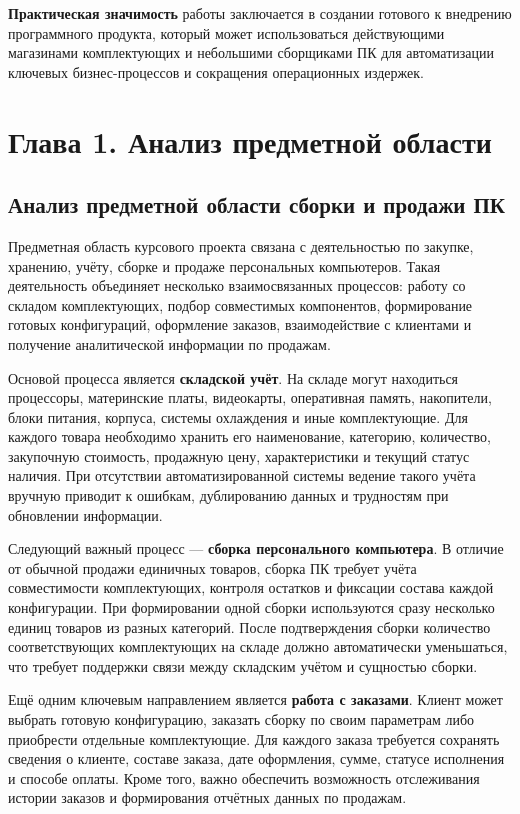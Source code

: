 \documentclass[14pt, a4paper]{extarticle}
\begin{document}
\textbf{Практическая значимость} работы заключается в создании готового к внедрению программного продукта, который может использоваться действующими магазинами комплектующих и небольшими сборщиками ПК для автоматизации ключевых бизнес-процессов и сокращения операционных издержек.

\section*{Глава 1. Анализ предметной области}

\subsection{Анализ предметной области сборки и продажи ПК}

Предметная область курсового проекта связана с деятельностью по закупке, хранению, учёту, сборке и продаже персональных компьютеров. Такая деятельность объединяет несколько взаимосвязанных процессов: работу со складом комплектующих, подбор совместимых компонентов, формирование готовых конфигураций, оформление заказов, взаимодействие с клиентами и получение аналитической информации по продажам.

Основой процесса является \textbf{складской учёт}. На складе могут находиться процессоры, материнские платы, видеокарты, оперативная память, накопители, блоки питания, корпуса, системы охлаждения и иные комплектующие. Для каждого товара необходимо хранить его наименование, категорию, количество, закупочную стоимость, продажную цену, характеристики и текущий статус наличия. При отсутствии автоматизированной системы ведение такого учёта вручную приводит к ошибкам, дублированию данных и трудностям при обновлении информации.

Следующий важный процесс --- \textbf{сборка персонального компьютера}. В отличие от обычной продажи единичных товаров, сборка ПК требует учёта совместимости комплектующих, контроля остатков и фиксации состава каждой конфигурации. При формировании одной сборки используются сразу несколько единиц товаров из разных категорий. После подтверждения сборки количество соответствующих комплектующих на складе должно автоматически уменьшаться, что требует поддержки связи между складским учётом и сущностью сборки.

Ещё одним ключевым направлением является \textbf{работа с заказами}. Клиент может выбрать готовую конфигурацию, заказать сборку по своим параметрам либо приобрести отдельные комплектующие. Для каждого заказа требуется сохранять сведения о клиенте, составе заказа, дате оформления, сумме, статусе исполнения и способе оплаты. Кроме того, важно обеспечить возможность отслеживания истории заказов и формирования отчётных данных по продажам.
\end{document}
